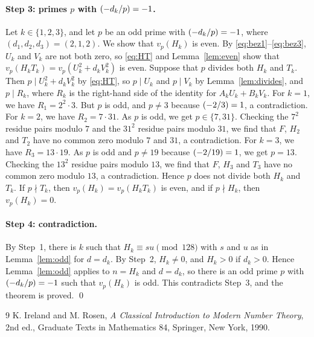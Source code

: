 \documentclass[11pt]{article}
\newcommand{\leg}[2]{\mathchoice{\biggl(\dfrac{#1}{#2}\biggr)}{(#1/#2)}{(#1/#2)}{(#1/#2)}}
\begin{document}
\paragraph{Step 3: primes $p$ with $\leg{-d_k}{p}=-1$.} Let $k\in\{1,2,3\}$, and let $p$ be an odd prime with $\leg{-d_k}{p}=-1$, where $(d_{1},d_{2},d_{3})=(2,1,2)$. We show that $v_p(H_k)$ is even. By \eqref{eq:bez1}--\eqref{eq:bez3}, $U_k$ and $V_k$ are not both zero, so \eqref{eq:HT} and Lemma~\ref{lem:even} show that $v_p(H_kT_k)=v_p(U_k^2+d_kV_k^2)$ is even. Suppose that $p$ divides both $H_k$ and $T_k$. Then $p\mid U_k^2+d_kV_k^2$ by \eqref{eq:HT}, so $p\mid U_k$ and $p\mid V_k$ by Lemma~\ref{lem:divides}, and $p\mid R_k$, where $R_k$ is the right-hand side of the identity for $A_kU_k+B_kV_k$. For $k=1$, we have $R_{1}=2^{2}\cdot 3$. But $p$ is odd, and $p\neq3$ because $\leg{-2}{3}=1$, a contradiction. For $k=2$, we have $R_{2}=7\cdot 31$. As $p$ is odd, we get $p\in\{7,31\}$. Checking the $7^2$ residue pairs modulo $7$ and the $31^2$ residue pairs modulo $31$, we find that $F$, $H_{2}$ and $T_{2}$ have no common zero modulo $7$ and $31$, a contradiction. For $k=3$, we have $R_{3}=13\cdot 19$. As $p$ is odd and $p\neq19$ because $\leg{-2}{19}=1$, we get $p=13$. Checking the $13^2$ residue pairs modulo $13$, we find that $F$, $H_{3}$ and $T_{3}$ have no common zero modulo $13$, a contradiction. Hence $p$ does not divide both $H_k$ and $T_k$. If $p\nmid T_k$, then $v_p(H_k)=v_p(H_kT_k)$ is even, and if $p\nmid H_k$, then $v_p(H_k)=0$.

\paragraph{Step 4: contradiction.} By Step~1, there is $k$ such that $H_k\equiv su\pmod{128}$ with $s$ and $u$ as in Lemma~\ref{lem:odd} for $d=d_k$. By Step~2, $H_k\neq0$, and $H_k>0$ if $d_k>0$. Hence Lemma~\ref{lem:odd} applies to $n=H_k$ and $d=d_k$, so there is an odd prime $p$ with $\leg{-d_k}{p}=-1$ such that $v_p(H_k)$ is odd. This contradicts Step~3, and the theorem is proved.
\qed

\begin{thebibliography}{9}
 K. Ireland and M. Rosen, \emph{A Classical Introduction to Modern Number Theory}, 2nd ed., Graduate Texts in Mathematics 84, Springer, New York, 1990.
\end{thebibliography}
\end{document}
